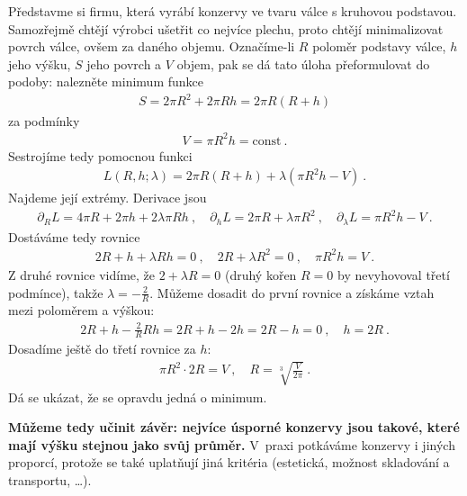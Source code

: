 \begin{example}[O konzervách]
    Představme si firmu, která vyrábí konzervy ve tvaru válce s kruhovou podstavou. Samozřejmě chtějí výrobci ušetřit co nejvíce plechu, proto chtějí minimalizovat povrch válce, ovšem za daného objemu.
    Označíme-li $R$ poloměr podstavy válce, $h$ jeho výšku, $S$ jeho povrch a $V$ objem, pak se dá tato úloha přeformulovat do podoby: nalezněte minimum funkce \begin{align}
        S = 2 \pi R^2 + 2 \pi R h = 2 \pi R (R+h)
    \end{align}
    za podmínky
    \begin{align}
        V = \pi R^2 h = \mathrm{const} \:.
    \end{align}
    Sestrojíme tedy pomocnou funkci \begin{align}
        L(R,h; \lambda) = 2 \pi R (R+h) + \lambda (\pi R^2 h - V)\:.
    \end{align}
    Najdeme její extrémy. Derivace jsou \begin{align}
        \partial_R L = 4 \pi R + 2 \pi h + 2 \lambda \pi R h \:, 
        \quad 
        \partial_h L = 2 \pi R + \lambda \pi R^2 \:, 
        \quad 
        \partial_\lambda L = \pi R^2 h - V \:.
    \end{align}
    Dostáváme tedy rovnice \begin{align}
        2R + h + \lambda R h = 0 \:, \quad 2 R + \lambda R^2 = 0 \:, \quad \pi R^2 h = V \:.
    \end{align}
    Z druhé rovnice vidíme, že $2+\lambda R = 0$ (druhý kořen $R=0$ by nevyhovoval třetí podmínce), takže $\lambda = -\frac{2}{R}$. Můžeme dosadit do první rovnice a získáme vztah mezi poloměrem a výškou:
    \begin{align}
        2 R + h - \frac{2}{R} R h = 2 R + h - 2h = 2R - h = 0 \:, \quad \boxed{h = 2R} \:.
    \end{align}
    Dosadíme ještě do třetí rovnice za $h$:
    \begin{align}
        \pi R^2 \cdot 2 R = V \:, \quad \boxed{ R = \sqrt[3]{\frac{V}{2 \pi} } } \:.
    \end{align}
    Dá se ukázat, že se opravdu jedná o minimum.

    \textbf{Můžeme tedy učinit závěr: nejvíce úsporné konzervy jsou takové, které mají výšku stejnou jako svůj průměr.} V~praxi potkáváme konzervy i jiných proporcí, protože se také uplatňují jiná kritéria (estetická, možnost skladování a transportu, \dots).
\end{example}